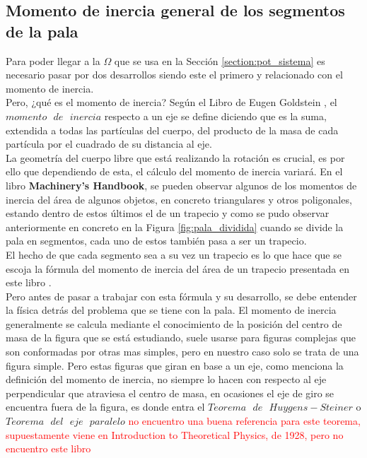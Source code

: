 \subsection{Momento de inercia general de los segmentos de la pala}

Para poder llegar a la $\Omega$ que se usa en la Sección \ref{section:pot_sistema} es necesario pasar por dos desarrollos siendo este el primero y relacionado con el momento de inercia.\\

Pero, ¿qué es el momento de inercia? Según el Libro de Eugen Goldstein \cite[.~269]{goldstein1987mecanica}, el $momento \text{ } de \text{ } inercia$ respecto a un eje se define diciendo que es la suma, extendida a todas las partículas del cuerpo, del producto de la masa de cada partícula por el cuadrado de su distancia al eje.\\


La geometría del cuerpo libre que está realizando la rotación es crucial, es por ello que dependiendo de esta, el cálculo del momento de inercia variará. En el libro \textbf{Machinery’s
Handbook}, se pueden observar algunos de los momentos de inercia del área de algunos objetos, en concreto triangulares y otros poligonales, estando dentro de estos últimos el de un trapecio y como se pudo observar anteriormente en concreto en la Figura \ref{fig:pala_dividida} cuando se divide la pala en segmentos, cada uno de estos también pasa a ser un trapecio.\\

El hecho de que cada segmento sea a su vez un trapecio es lo que hace que se escoja la fórmula del momento de inercia del área de un trapecio presentada en este libro \cite[p.~242]{oberg2012machinery}. \\

Pero antes de pasar a trabajar con esta fórmula y su desarrollo, se debe entender la física detrás del problema que se tiene con la pala. El momento de inercia generalmente se calcula mediante el conocimiento de la posición del centro de masa de la figura que se está estudiando, suele usarse para figuras complejas que son conformadas por otras mas simples, pero en nuestro caso solo se trata de una figura simple. Pero estas figuras que giran en base a un eje, como menciona la definición del momento de inercia, no siempre lo hacen con respecto al eje perpendicular que atraviesa el centro de masa, en ocasiones el eje de giro se encuentra fuera de la figura, es donde entra el $Teorema \text{ } de \text{ } Huygens-Steiner$ o $Teorema \text{ } del \text{ } eje \text{ } paralelo$ \textcolor{red}{no encuentro una buena referencia para este teorema, supuestamente viene en Introduction to Theoretical Physics, de 1928, pero no encuentro este libro} \\

